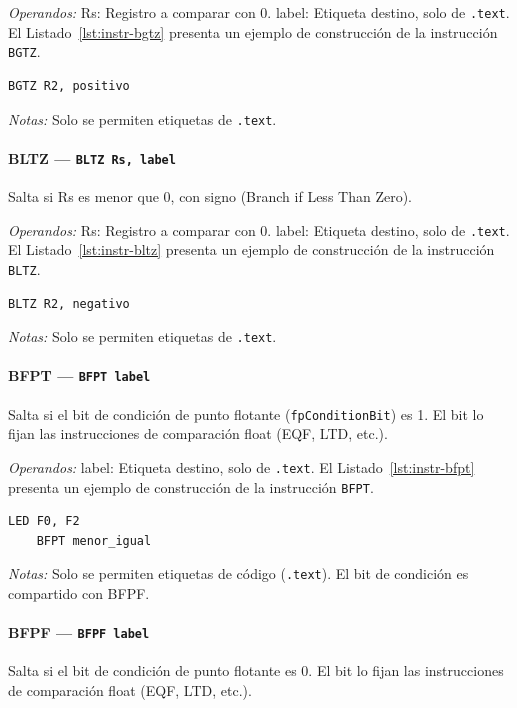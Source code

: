 \documentclass[../main.tex]{subfiles}
\begin{document}
\textit{Operandos:} Rs: Registro a comparar con 0. label: Etiqueta destino, solo de \texttt{.text}.
El Listado~\ref{lst:instr-bgtz} presenta un ejemplo de construcción de la instrucción \texttt{BGTZ}.

\begin{lstlisting}[caption={BGTZ},label={lst:instr-bgtz}]
	BGTZ R2, positivo
\end{lstlisting}
\textit{Notas:} Solo se permiten etiquetas de \texttt{.text}.

\paragraph*{BLTZ --- \texttt{BLTZ Rs, label}}
Salta si Rs es menor que 0, con signo (Branch if Less Than Zero).

\textit{Operandos:} Rs: Registro a comparar con 0. label: Etiqueta destino, solo de \texttt{.text}.
El Listado~\ref{lst:instr-bltz} presenta un ejemplo de construcción de la instrucción \texttt{BLTZ}.

\begin{lstlisting}[caption={BLTZ},label={lst:instr-bltz}]
	BLTZ R2, negativo
\end{lstlisting}
\textit{Notas:} Solo se permiten etiquetas de \texttt{.text}.

\paragraph*{BFPT --- \texttt{BFPT label}}
Salta si el bit de condición de punto flotante (\texttt{fpConditionBit}) es 1. El bit lo fijan las instrucciones de comparación float (EQF, LTD, etc.).

\textit{Operandos:} label: Etiqueta destino, solo de \texttt{.text}.
El Listado~\ref{lst:instr-bfpt} presenta un ejemplo de construcción de la instrucción \texttt{BFPT}.

\begin{lstlisting}[caption={BFPT},label={lst:instr-bfpt}]
	LED F0, F2
	BFPT menor_igual
\end{lstlisting}
\textit{Notas:} Solo se permiten etiquetas de código (\texttt{.text}). El bit de condición es compartido con BFPF.

\paragraph*{BFPF --- \texttt{BFPF label}}
Salta si el bit de condición de punto flotante es 0. El bit lo fijan las instrucciones de comparación float (EQF, LTD, etc.).
\end{document}
